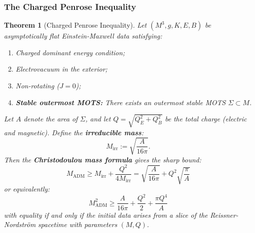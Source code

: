 \documentclass[12pt]{article}
\theoremstyle{plain}
\newtheorem{theorem}{Theorem}[section]
\theoremstyle{definition}
\theoremstyle{remark}
\newcommand{\ADM}{\mathrm{ADM}}
\begin{document}
\subsubsection{The Charged Penrose Inequality}

\begin{theorem}[Charged Penrose Inequality]\label{thm:charged-penrose}
Let $(M^3, g, K, E, B)$ be asymptotically flat Einstein-Maxwell data satisfying:
\begin{enumerate}[label=\textup{(C\arabic*)}]
    \item Charged dominant energy condition;
    \item Electrovacuum in the exterior;
    \item Non-rotating ($J = 0$);
    \item \textbf{Stable outermost MOTS:} There exists an outermost stable MOTS $\Sigma \subset M$.
\end{enumerate}
Let $A$ denote the area of $\Sigma$, and let $Q = \sqrt{Q_E^2 + Q_B^2}$ be the total charge (electric and magnetic). Define the \textbf{irreducible mass}:
\begin{equation}
    M_{\mathrm{irr}} := \sqrt{\frac{A}{16\pi}}.
\end{equation}
Then the \textbf{Christodoulou mass formula} gives the sharp bound:
\begin{equation}\label{eq:charged-penrose-main}
    M_{\ADM} \geq M_{\mathrm{irr}} + \frac{Q^2}{4M_{\mathrm{irr}}} = \sqrt{\frac{A}{16\pi}} + Q^2\sqrt{\frac{\pi}{A}}
\end{equation}
or equivalently:
\begin{equation}\label{eq:charged-penrose-squared}
    M_{\ADM}^2 \geq \frac{A}{16\pi} + \frac{Q^2}{2} + \frac{\pi Q^4}{A}
\end{equation}
with equality if and only if the initial data arises from a slice of the Reissner-Nordstr\"om spacetime with parameters $(M, Q)$.
\end{theorem}
\end{document}
